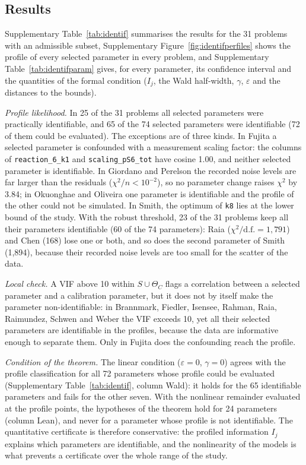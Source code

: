 

\subsection*{Results}
Supplementary Table~\ref{tab:identif} summarises the results for the 31 problems with an admissible subset, Supplementary Figure~\ref{fig:identifperfiles} shows the profile of every selected parameter in every problem, and Supplementary Table~\ref{tab:identifparam} gives, for every parameter, its confidence interval and the quantities of the formal condition ($I_j$, the Wald half-width, $\gamma$, $\varepsilon$ and the distances to the bounds).

\emph{Profile likelihood.} In 25 of the 31 problems all selected parameters were practically identifiable, and 65 of the 74 selected parameters were identifiable (72 of them could be evaluated). The exceptions are of three kinds. In Fujita a selected parameter is confounded with a measurement scaling factor: the columns of \texttt{reaction\_6\_k1} and \texttt{scaling\_pS6\_tot} have cosine 1.00, and neither selected parameter is identifiable. In Giordano and Perelson the recorded noise levels are far larger than the residuals ($\chi^2/n<10^{-2}$), so no parameter change raises $\chi^2$ by 3.84; in Okuonghae and Oliveira one parameter is identifiable and the profile of the other could not be simulated. In Smith, the optimum of \texttt{k8} lies at the lower bound of the study. With the robust threshold, 23 of the 31 problems keep all their parameters identifiable (60 of the 74 parameters): Raia ($\chi^2/\mathrm{d.f.}=1{,}791$) and Chen (168) lose one or both, and so does the second parameter of Smith (1{,}894), because their recorded noise levels are too small for the scatter of the data.

\emph{Local check.} A VIF above 10 within $S\cup\Theta_C$ flags a correlation between a selected parameter and a calibration parameter, but it does not by itself make the parameter non-identifiable: in Brannmark, Fiedler, Isensee, Rahman, Raia, Raimundez, Schwen and Weber the VIF exceeds 10, yet all their selected parameters are identifiable in the profiles, because the data are informative enough to separate them. Only in Fujita does the confounding reach the profile.

\emph{Condition of the theorem.} The linear condition ($\varepsilon=0$, $\gamma=0$) agrees with the profile classification for all 72 parameters whose profile could be evaluated (Supplementary Table~\ref{tab:identif}, column Wald): it holds for the 65 identifiable parameters and fails for the other seven. With the nonlinear remainder evaluated at the profile points, the hypotheses of the theorem hold for 24 parameters (column Lean), and never for a parameter whose profile is not identifiable. The quantitative certificate is therefore conservative: the profiled information $I_j$ explains which parameters are identifiable, and the nonlinearity of the models is what prevents a certificate over the whole range of the study.

